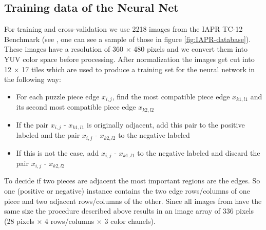 \documentclass[11pt]{report}
\begin{document}
\subsection{Training data of the Neural Net}
For training and cross-validation we use 2218 images from the IAPR TC-12 Benchmark (see \cite{grubinger06}, one can see a sample of those in figure \ref{fig:IAPR-database}). These images have a resolution of 360 $\times$ 480 pixels and we convert them into YUV color space before processing. After normalization the images get cut into 12 $\times$ 17 tiles which are used to produce a training set for the neural network in the following way:
\begin{itemize}
	\item For each puzzle piece edge $x_{i,j}$, find the most compatible piece edge $x_{k1,l1}$ and its second most compatible piece edge $x_{k2,l2}$
	\item  If the pair $x_{i,j}$ - $x_{k1,l1}$ is originally adjacent, add this pair to the positive labeled and the pair $x_{i,j}$ - $x_{k2,l2}$ to the negative labeled
	\item If this is not the case, add $x_{i,j}$ - $x_{k1,l1}$ to the negative labeled and discard the pair $x_{i,j}$ - $x_{k2,l2}$
\end{itemize}
To decide if two pieces are adjacent the most important regions are the edges. So one (positive or negative) instance contains the two edge rows/columns of one piece and two adjacent rows/columns of the other. Since all images from \cite{grubinger06} have the same size the procedure described above results in an image array of 336 pixels (28 pixels $\times$ 4 rows/columns $\times$ 3 color chanels).
\end{document}
